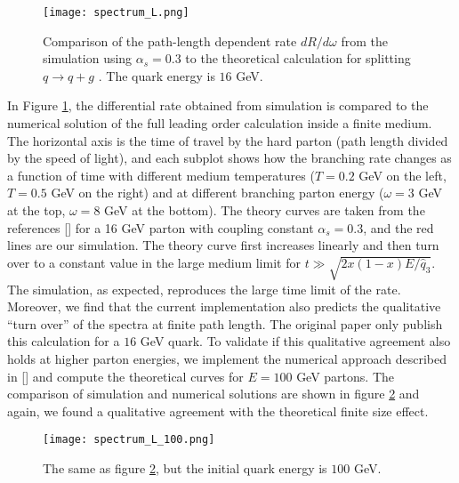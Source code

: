 \begin{figure}
\centering
\texttt{[image: spectrum\_L.png]}
\caption{Comparison of the path-length dependent rate $dR/d\omega$ from the simulation using $\alpha_s = 0.3$ to the theoretical calculation for splitting $q\rightarrow q+g$ \cite{CaronHuot:2010bp}. The quark energy is $16$ GeV.}
\label{fig:spectra-L-alphas=0.3}
\end{figure}

In Figure \ref{fig:spectra-L-alphas=0.3}, the differential rate obtained from simulation is compared to the numerical solution of the full leading order calculation inside a finite medium.
The horizontal axis is the time of travel by the hard parton (path length divided by the speed of light), and each subplot shows how the branching rate changes as a function of time with different medium temperatures ($T=0.2$ GeV on the left, $T=0.5$ GeV on the right) and at different branching parton energy ($\omega=3$ GeV at the top, $\omega=8$ GeV at the bottom).
The theory curves are taken from the references [] for a 16 GeV parton with coupling constant $\alpha_s = 0.3$, and the red lines are our simulation.
The theory curve first increases linearly and then turn over to a constant value in the large medium limit for $t \gg \sqrt{2x(1-x)E/\hat{q}_3}$.
The simulation, as expected, reproduces the large time limit of the rate.
Moreover, we find that the current implementation also predicts the qualitative ``turn over'' of the spectra at finite path length.
The original paper only publish this calculation for a $16$ GeV quark. 
To validate if this qualitative agreement also holds at higher parton energies, we implement the numerical approach described in [] and compute the theoretical curves for $E=100$ GeV partons.
The comparison of simulation and numerical solutions are shown in figure \ref{fig:spectra-L-alphas=0.3-E100} and again, we found a qualitative agreement with the theoretical finite size effect.


\begin{figure}
\centering
\texttt{[image: spectrum\_L\_100.png]}
\caption{The same as figure \ref{fig:spectra-L-alphas=0.3-E100}, but the initial quark energy is $100$ GeV.}
\label{fig:spectra-L-alphas=0.3-E100}
\end{figure}

